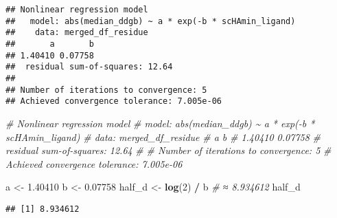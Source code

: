 \documentclass[
]{article}
\newenvironment{Shaded}{\begin{snugshade}}{\end{snugshade}}
\newcommand{\CommentTok}[1]{\textcolor[rgb]{0.56,0.35,0.01}{\textit{#1}}}
\newcommand{\DecValTok}[1]{\textcolor[rgb]{0.00,0.00,0.81}{#1}}
\newcommand{\FloatTok}[1]{\textcolor[rgb]{0.00,0.00,0.81}{#1}}
\newcommand{\FunctionTok}[1]{\textcolor[rgb]{0.13,0.29,0.53}{\textbf{#1}}}
\newcommand{\NormalTok}[1]{#1}
\newcommand{\OtherTok}[1]{\textcolor[rgb]{0.56,0.35,0.01}{#1}}
\newcommand{\SpecialCharTok}[1]{\textcolor[rgb]{0.81,0.36,0.00}{\textbf{#1}}}
\begin{document}
\begin{verbatim}
## Nonlinear regression model
##   model: abs(median_ddgb) ~ a * exp(-b * scHAmin_ligand)
##    data: merged_df_residue
##       a       b 
## 1.40410 0.07758 
##  residual sum-of-squares: 12.64
## 
## Number of iterations to convergence: 5 
## Achieved convergence tolerance: 7.005e-06
\end{verbatim}

\begin{Shaded}
\begin{Highlighting}[]
\CommentTok{\# Nonlinear regression model}
\CommentTok{\#   model: abs(median\_ddgb) \textasciitilde{} a * exp({-}b * scHAmin\_ligand)}
\CommentTok{\#    data: merged\_df\_residue}
\CommentTok{\#       a       b }
\CommentTok{\# 1.40410 0.07758 }
\CommentTok{\#  residual sum{-}of{-}squares: 12.64}
\CommentTok{\# }
\CommentTok{\# Number of iterations to convergence: 5 }
\CommentTok{\# Achieved convergence tolerance: 7.005e{-}06}

\NormalTok{a }\OtherTok{\textless{}{-}} \FloatTok{1.40410}
\NormalTok{b }\OtherTok{\textless{}{-}}  \FloatTok{0.07758} 
\NormalTok{half\_d }\OtherTok{\textless{}{-}} \FunctionTok{log}\NormalTok{(}\DecValTok{2}\NormalTok{) }\SpecialCharTok{/}\NormalTok{ b  }\CommentTok{\# ≈ 8.934612}
\NormalTok{half\_d}
\end{Highlighting}
\end{Shaded}

\begin{verbatim}
## [1] 8.934612
\end{verbatim}
\end{document}
